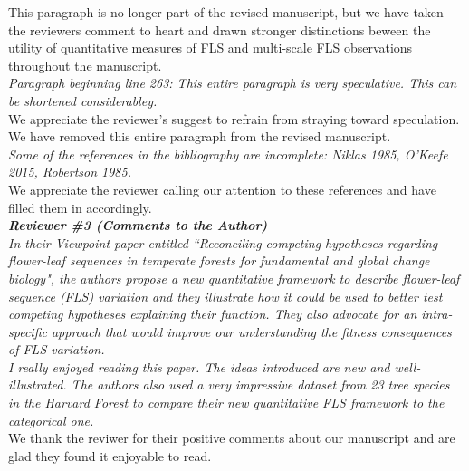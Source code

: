 \documentclass{article}[11pt]
\begin{document}
{{\noindent This paragraph is no longer part of the revised manuscript, but we have taken the reviewers comment to heart and drawn stronger distinctions beween the utility of quantitative measures of FLS and multi-scale FLS observations throughout the manuscript.\\ 

\emph{Paragraph beginning line 263: This entire paragraph is very speculative. This can be shortened considerabley.}\\

\noindent We appreciate the reviewer's suggest to refrain from straying toward speculation. We have removed this entire paragraph from the revised manuscript.\\

\emph{Some of the references in the bibliography are incomplete: Niklas 1985, O'Keefe 2015,  Robertson 1985.}\\
 
\noindent We appreciate the reviewer calling our attention to these references and have filled them in accordingly.\\

\emph{{\bf Reviewer \#3 (Comments to the Author)}}\\
\emph{In their Viewpoint paper entitled ``Reconciling competing hypotheses regarding flower-leaf sequences in temperate forests for fundamental and global change biology", the authors propose a new quantitative framework to describe flower-leaf sequence (FLS) variation and they illustrate how it could be used to better test competing hypotheses explaining their function. They also advocate for an intra-specific approach that would improve our understanding the fitness consequences of FLS variation.\\
I really enjoyed reading this paper. The ideas introduced are new and well-illustrated. The authors also used a very impressive dataset from 23 tree species in the Harvard Forest to compare their new quantitative FLS framework to the categorical one.}\\

\noindent We thank the reviwer for their positive comments about our manuscript and are glad they found it enjoyable to read.\\

}}
\end{document}
